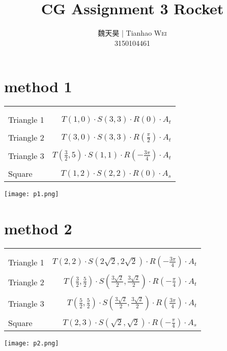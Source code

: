 \documentclass[a4paper,10pt]{article} %
\begin{document}
\title{\Huge CG Assignment 3 Rocket}
\author{魏天昊 | Tianhao \textsc{Wei}\\ 3150104461}


\section{method 1} {
	\begin{multicols}{2}
		{\large
		\begin{tabular}{l|r}
		\multicolumn{2}{c}{}\\
		\multicolumn{2}{c}{}\\
		Triangle 1& $T(1,0) \cdot S(3,3) \cdot R(0) \cdot A_t $ \\ \multicolumn{2}{c}{}\\
		Triangle 2& $T(3,0) \cdot S(3,3) \cdot R(\frac{\pi}{2}) \cdot A_t $ \\\multicolumn{2}{c}{} \\
		Triangle 3& $T(\frac{3}{2}, 5) \cdot S(1,1) \cdot R(-\frac{3\pi}{4}) \cdot A_t $\\ \multicolumn{2}{c}{}\\
		Square& $T(1,2) \cdot S(2,2) \cdot R(0) \cdot  A_s $\\
		\end{tabular}
		}
	\columnbreak
	\hfill \texttt{[image: p1.png]}
	\end{multicols}
}

\section{method 2}{
	\begin{multicols}{2}
		{\large
		\begin{tabular}{l|r}
		\multicolumn{2}{c}{}\\
		\multicolumn{2}{c}{}\\
		Triangle 1& $T(2,2) \cdot S(2\sqrt{2},2\sqrt{2}) \cdot R(-\frac{3\pi}{4}) \cdot A_t $\\ \multicolumn{2}{c}{}\\
		Triangle 2& $T(\frac{3}{2},\frac{5}{2}) \cdot S(\frac{3\sqrt{2}}{2},\frac{3\sqrt{2}}{2}) \cdot R(-\frac{\pi}{4}) \cdot A_t $\\ \multicolumn{2}{c}{}\\
		Triangle 3& $T(\frac{5}{2},\frac{5}{2}) \cdot S(\frac{3\sqrt{2}}{2},\frac{3\sqrt{2}}{2}) \cdot R(\frac{3\pi}{4}) \cdot A_t $\\ \multicolumn{2}{c}{}\\
		Square& $T(2,3) \cdot S(\sqrt{2},\sqrt{2}) \cdot R(-\frac{\pi}{4}) \cdot A_s $\\
		\end{tabular}
		}
	\columnbreak
	\hfill \texttt{[image: p2.png]}
	\end{multicols}
}
\end{document}
